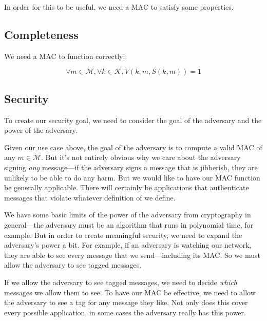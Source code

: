 In order for this to be useful, we need a MAC to satisfy some properties.

\subsection{Completeness}
We need a MAC to function correctly:

\[ \forall m \in \mathcal{M}, \forall k \in \mathcal{K}, V(k, m, S(k, m)) = 1 \]

\subsection{Security}
To create our security goal, we need to consider the goal of the adversary and the power of the adversary.

Given our use case above, the goal of the adversary is to compute a valid MAC of any $m\in \mathcal{M}$. But it's not entirely obvious why we care about the adversary signing \textit{any} message---if the adversary signs a message that is jibberish, they are unlikely to be able to do any harm. But we would like to have our MAC function be generally applicable. There will certainly be applications that authenticate messages that violate whatever definition of  we define.

We have some basic limits of the power of the adversary from cryptography in general---the adversary must be an algorithm that runs in polynomial time, for example. But in order to create meaningful security, we need to expand the adversary's power a bit. For example, if an adversary is watching our network, they are able to see every message that we send---including its MAC. So we must allow the adversary to see tagged messages. 

If we allow the adversary to see tagged messages, we need to decide \emph{which} messages we allow them to see. To have our MAC be effective, we need to allow the adversary to see a tag for any message they like. Not only does this cover every possible application, in some cases the adversary really has this power.


